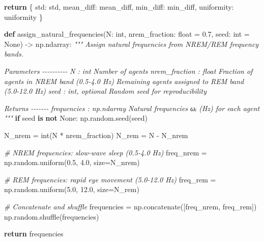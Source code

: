 \documentclass[
]{article}
\newenvironment{Shaded}{}{}
\newcommand{\BuiltInTok}[1]{\textcolor[rgb]{0.00,0.50,0.00}{#1}}
\newcommand{\CommentTok}[1]{\textcolor[rgb]{0.38,0.63,0.69}{\textit{#1}}}
\newcommand{\ControlFlowTok}[1]{\textcolor[rgb]{0.00,0.44,0.13}{\textbf{#1}}}
\newcommand{\FloatTok}[1]{\textcolor[rgb]{0.25,0.63,0.44}{#1}}
\newcommand{\KeywordTok}[1]{\textcolor[rgb]{0.00,0.44,0.13}{\textbf{#1}}}
\newcommand{\NormalTok}[1]{#1}
\newcommand{\OperatorTok}[1]{\textcolor[rgb]{0.40,0.40,0.40}{#1}}
\newcommand{\StringTok}[1]{\textcolor[rgb]{0.25,0.44,0.63}{#1}}
\newcommand{\VariableTok}[1]{\textcolor[rgb]{0.10,0.09,0.49}{#1}}
\begin{document}
\begin{Shaded}
\begin{Highlighting}[]
    \ControlFlowTok{return}\NormalTok{ \{}
        \StringTok{\textquotesingle{}std\textquotesingle{}}\NormalTok{: std,}
        \StringTok{\textquotesingle{}mean\_diff\textquotesingle{}}\NormalTok{: mean\_diff,}
        \StringTok{\textquotesingle{}min\_diff\textquotesingle{}}\NormalTok{: min\_diff,}
        \StringTok{\textquotesingle{}uniformity\textquotesingle{}}\NormalTok{: uniformity}
\NormalTok{    \}}


\KeywordTok{def}\NormalTok{ assign\_natural\_frequencies(N: }\BuiltInTok{int}\NormalTok{,}
\NormalTok{                               nrem\_fraction: }\BuiltInTok{float} \OperatorTok{=} \FloatTok{0.7}\NormalTok{,}
\NormalTok{                               seed: }\BuiltInTok{int} \OperatorTok{=} \VariableTok{None}\NormalTok{) }\OperatorTok{{-}\textgreater{}}\NormalTok{ np.ndarray:}
    \CommentTok{"""}
\CommentTok{    Assign natural frequencies from NREM/REM frequency bands.}

\CommentTok{    Parameters}
\CommentTok{    {-}{-}{-}{-}{-}{-}{-}{-}{-}{-}}
\CommentTok{    N : int}
\CommentTok{        Number of agents}
\CommentTok{    nrem\_fraction : float}
\CommentTok{        Fraction of agents in NREM band (0.5{-}4.0 Hz)}
\CommentTok{        Remaining agents assigned to REM band (5.0{-}12.0 Hz)}
\CommentTok{    seed : int, optional}
\CommentTok{        Random seed for reproducibility}

\CommentTok{    Returns}
\CommentTok{    {-}{-}{-}{-}{-}{-}{-}}
\CommentTok{    frequencies : np.ndarray}
\CommentTok{        Natural frequencies ωᵢ (Hz) for each agent}
\CommentTok{    """}
    \ControlFlowTok{if}\NormalTok{ seed }\KeywordTok{is} \KeywordTok{not} \VariableTok{None}\NormalTok{:}
\NormalTok{        np.random.seed(seed)}

\NormalTok{    N\_nrem }\OperatorTok{=} \BuiltInTok{int}\NormalTok{(N }\OperatorTok{*}\NormalTok{ nrem\_fraction)}
\NormalTok{    N\_rem }\OperatorTok{=}\NormalTok{ N }\OperatorTok{{-}}\NormalTok{ N\_nrem}

    \CommentTok{\# NREM frequencies: slow{-}wave sleep (0.5{-}4.0 Hz)}
\NormalTok{    freq\_nrem }\OperatorTok{=}\NormalTok{ np.random.uniform(}\FloatTok{0.5}\NormalTok{, }\FloatTok{4.0}\NormalTok{, size}\OperatorTok{=}\NormalTok{N\_nrem)}

    \CommentTok{\# REM frequencies: rapid eye movement (5.0{-}12.0 Hz)}
\NormalTok{    freq\_rem }\OperatorTok{=}\NormalTok{ np.random.uniform(}\FloatTok{5.0}\NormalTok{, }\FloatTok{12.0}\NormalTok{, size}\OperatorTok{=}\NormalTok{N\_rem)}

    \CommentTok{\# Concatenate and shuffle}
\NormalTok{    frequencies }\OperatorTok{=}\NormalTok{ np.concatenate([freq\_nrem, freq\_rem])}
\NormalTok{    np.random.shuffle(frequencies)}

    \ControlFlowTok{return}\NormalTok{ frequencies}
\end{Highlighting}
\end{Shaded}
\end{document}
